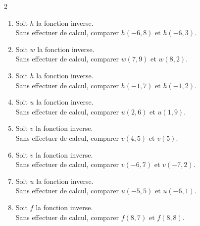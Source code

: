 {\newpage

\begin{Exercice}
\leavevmode\vspace{-\baselineskip}
\vspace{-0.5cm}
\begin{multicols}{2}
\begin{enumerate}[itemsep=1.5em]
	\item \begin{minipage}[t]{\linewidth} Soit $h$ la fonction inverse.\\
            Sans effectuer de calcul, comparer $h(-6{,}8)$ et $h(-6{,}3)$. \end{minipage}
	\item \begin{minipage}[t]{\linewidth} Soit $w$ la fonction inverse.\\
            Sans effectuer de calcul, comparer $w(7{,}9)$ et $w(8{,}2)$. \end{minipage}
	\item \begin{minipage}[t]{\linewidth} Soit $h$ la fonction inverse.\\
            Sans effectuer de calcul, comparer $h(-1{,}7)$ et $h(-1{,}2)$. \end{minipage}
	\item \begin{minipage}[t]{\linewidth} Soit $u$ la fonction inverse.\\
            Sans effectuer de calcul, comparer $u(2{,}6)$ et $u(1{,}9)$. \end{minipage}
	\item \begin{minipage}[t]{\linewidth} Soit $v$ la fonction inverse.\\
            Sans effectuer de calcul, comparer $v(4{,}5)$ et $v(5)$. \end{minipage}
	\item \begin{minipage}[t]{\linewidth} Soit $v$ la fonction inverse.\\
            Sans effectuer de calcul, comparer $v(-6{,}7)$ et $v(-7{,}2)$. \end{minipage}
	\item \begin{minipage}[t]{\linewidth} Soit $u$ la fonction inverse.\\
            Sans effectuer de calcul, comparer $u(-5{,}5)$ et $u(-6{,}1)$. \end{minipage}
	\item \begin{minipage}[t]{\linewidth} Soit $f$ la fonction inverse.\\
            Sans effectuer de calcul, comparer $f(8{,}7)$ et $f(8{,}8)$. \end{minipage}
\end{enumerate}
\end{multicols}
\end{Exercice}



}
